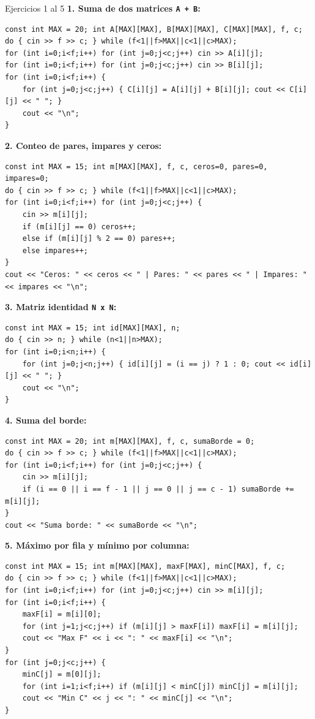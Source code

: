 \documentclass[11pt,letterpaper]{article}
\begin{document}
\begin{solucion}{Ejercicios 1 al 5}
\textbf{1. Suma de dos matrices \texttt{A + B}:}
\begin{lstlisting}[style=cppmonitoria]
const int MAX = 20; int A[MAX][MAX], B[MAX][MAX], C[MAX][MAX], f, c;
do { cin >> f >> c; } while (f<1||f>MAX||c<1||c>MAX);
for (int i=0;i<f;i++) for (int j=0;j<c;j++) cin >> A[i][j];
for (int i=0;i<f;i++) for (int j=0;j<c;j++) cin >> B[i][j];
for (int i=0;i<f;i++) {
    for (int j=0;j<c;j++) { C[i][j] = A[i][j] + B[i][j]; cout << C[i][j] << " "; }
    cout << "\n";
}
\end{lstlisting}

\textbf{2. Conteo de pares, impares y ceros:}
\begin{lstlisting}[style=cppmonitoria]
const int MAX = 15; int m[MAX][MAX], f, c, ceros=0, pares=0, impares=0;
do { cin >> f >> c; } while (f<1||f>MAX||c<1||c>MAX);
for (int i=0;i<f;i++) for (int j=0;j<c;j++) {
    cin >> m[i][j];
    if (m[i][j] == 0) ceros++;
    else if (m[i][j] % 2 == 0) pares++;
    else impares++;
}
cout << "Ceros: " << ceros << " | Pares: " << pares << " | Impares: " << impares << "\n";
\end{lstlisting}

\textbf{3. Matriz identidad \texttt{N x N}:}
\begin{lstlisting}[style=cppmonitoria]
const int MAX = 15; int id[MAX][MAX], n;
do { cin >> n; } while (n<1||n>MAX);
for (int i=0;i<n;i++) {
    for (int j=0;j<n;j++) { id[i][j] = (i == j) ? 1 : 0; cout << id[i][j] << " "; }
    cout << "\n";
}
\end{lstlisting}

\textbf{4. Suma del borde:}
\begin{lstlisting}[style=cppmonitoria]
const int MAX = 20; int m[MAX][MAX], f, c, sumaBorde = 0;
do { cin >> f >> c; } while (f<1||f>MAX||c<1||c>MAX);
for (int i=0;i<f;i++) for (int j=0;j<c;j++) {
    cin >> m[i][j];
    if (i == 0 || i == f - 1 || j == 0 || j == c - 1) sumaBorde += m[i][j];
}
cout << "Suma borde: " << sumaBorde << "\n";
\end{lstlisting}

\textbf{5. Máximo por fila y mínimo por columna:}
\begin{lstlisting}[style=cppmonitoria]
const int MAX = 15; int m[MAX][MAX], maxF[MAX], minC[MAX], f, c;
do { cin >> f >> c; } while (f<1||f>MAX||c<1||c>MAX);
for (int i=0;i<f;i++) for (int j=0;j<c;j++) cin >> m[i][j];
for (int i=0;i<f;i++) {
    maxF[i] = m[i][0];
    for (int j=1;j<c;j++) if (m[i][j] > maxF[i]) maxF[i] = m[i][j];
    cout << "Max F" << i << ": " << maxF[i] << "\n";
}
for (int j=0;j<c;j++) {
    minC[j] = m[0][j];
    for (int i=1;i<f;i++) if (m[i][j] < minC[j]) minC[j] = m[i][j];
    cout << "Min C" << j << ": " << minC[j] << "\n";
}
\end{lstlisting}
\end{solucion}
\end{document}
